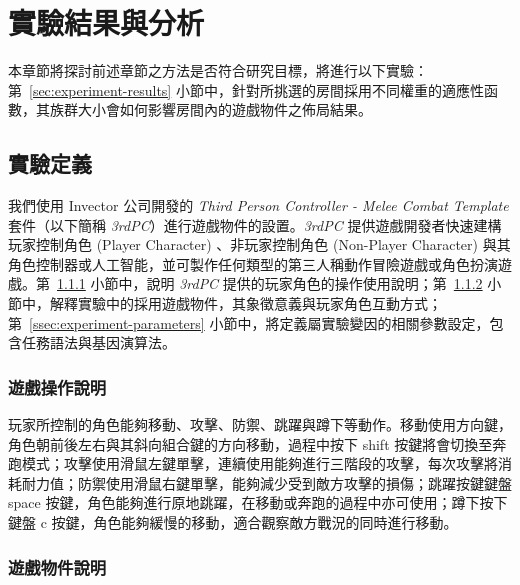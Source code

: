 \newcommand{\garesultstable}[5]{{
\begin{table}[H]
  \centering
  \caption{實驗 #2 - 共 #3 回合的最佳個體之標準化加權適應值}
  \label{tbl:result-of-experiment-#1}
  \bigskip
  \vspace{-5mm}
  \garesultssubtable{#4}
  \garesultssubtable{#5}
\end{table}
}}

\chapter{實驗結果與分析}
\label{cha:experiment}

本章節將探討前述章節之方法是否符合研究目標，將進行以下實驗：第~\ref{sec:experiment-results} 小節中，針對所挑選的房間採用不同權重的適應性函數，其族群大小會如何影響房間內的遊戲物件之佈局結果。

\section{實驗定義}
\label{sec:experiment-definition}

我們使用 Invector 公司開發的 \textit{Third Person Controller - Melee Combat Template} 套件（以下簡稱 \textit{3rdPC}）進行遊戲物件的設置。\textit{3rdPC} 提供遊戲開發者快速建構玩家控制角色 (Player Character) 、非玩家控制角色 (Non-Player Character) 與其角色控制器或人工智能，並可製作任何類型的第三人稱動作冒險遊戲或角色扮演遊戲。第~\ref{ssec:experiment-gameplaymanual} 小節中，說明 \textit{3rdPC} 提供的玩家角色的操作使用說明；第~\ref{ssec:experiment-gameobjects} 小節中，解釋實驗中的採用遊戲物件，其象徵意義與玩家角色互動方式；第~\ref{ssec:experiment-parameters} 小節中，將定義屬實驗變因的相關參數設定，包含任務語法與基因演算法。

\subsection{遊戲操作說明}
\label{ssec:experiment-gameplaymanual}

玩家所控制的角色能夠移動、攻擊、防禦、跳躍與蹲下等動作。移動使用方向鍵，角色朝前後左右與其斜向組合鍵的方向移動，過程中按下 shift 按鍵將會切換至奔跑模式；攻擊使用滑鼠左鍵單擊，連續使用能夠進行三階段的攻擊，每次攻擊將消耗耐力值；防禦使用滑鼠右鍵單擊，能夠減少受到敵方攻擊的損傷；跳躍按鍵鍵盤 space 按鍵，角色能夠進行原地跳躍，在移動或奔跑的過程中亦可使用；蹲下按下鍵盤 c 按鍵，角色能夠緩慢的移動，適合觀察敵方戰況的同時進行移動。

\subsection{遊戲物件說明}
\label{ssec:experiment-gameobjects}


